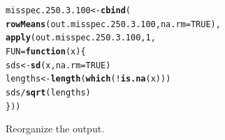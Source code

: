 \documentclass[11pt]{article}\usepackage[]{graphicx}\usepackage[]{color}
\makeatletter
\newcommand{\hlnum}[1]{\textcolor[rgb]{0.686,0.059,0.569}{#1}}%
\newcommand{\hlopt}[1]{\textcolor[rgb]{0,0,0}{#1}}%
\newcommand{\hlstd}[1]{\textcolor[rgb]{0.345,0.345,0.345}{#1}}%
\newcommand{\hlkwa}[1]{\textcolor[rgb]{0.161,0.373,0.58}{\textbf{#1}}}%
\newcommand{\hlkwb}[1]{\textcolor[rgb]{0.69,0.353,0.396}{#1}}%
\newcommand{\hlkwc}[1]{\textcolor[rgb]{0.333,0.667,0.333}{#1}}%
\newcommand{\hlkwd}[1]{\textcolor[rgb]{0.737,0.353,0.396}{\textbf{#1}}}%
\newenvironment{kframe}{%
 \def\at@end@of@kframe{}%
 \ifinner\ifhmode%
  \def\at@end@of@kframe{\end{minipage}}%
  \begin{minipage}{\columnwidth}%
 \fi\fi%
 \def\FrameCommand##1{\hskip\@totalleftmargin \hskip-\fboxsep
 \colorbox{shadecolor}{##1}\hskip-\fboxsep
     \hskip-\linewidth \hskip-\@totalleftmargin \hskip\columnwidth}%
 \MakeFramed {\advance\hsize-\width
   \@totalleftmargin\z@ \linewidth\hsize
   \@setminipage}}%
 {\par\unskip\endMakeFramed%
 \at@end@of@kframe}
\newenvironment{knitrout}{}{} %
\makeatother
\begin{document}
\begin{knitrout}
\color{fgcolor}\begin{kframe}
\begin{alltt}
\hlstd{misspec.250.3.100} \hlkwb{<-} \hlkwd{cbind}\hlstd{(}
  \hlkwd{rowMeans}\hlstd{(out.misspec.250.3.100,} \hlkwc{na.rm} \hlstd{=} \hlnum{TRUE}\hlstd{),}
  \hlkwd{apply}\hlstd{(out.misspec.250.3.100,} \hlnum{1}\hlstd{,}
  \hlkwc{FUN} \hlstd{=} \hlkwa{function}\hlstd{(}\hlkwc{x}\hlstd{)\{}
    \hlstd{sds} \hlkwb{<-} \hlkwd{sd}\hlstd{(x,} \hlkwc{na.rm} \hlstd{=} \hlnum{TRUE}\hlstd{)}
    \hlstd{lengths} \hlkwb{<-} \hlkwd{length}\hlstd{(}\hlkwd{which}\hlstd{(}\hlopt{!}\hlkwd{is.na}\hlstd{(x)))}
    \hlstd{sds} \hlopt{/} \hlkwd{sqrt}\hlstd{(lengths)}
  \hlstd{\}))}
\end{alltt}
\end{kframe}
\end{knitrout}

Reorganize the output.
\end{document}
